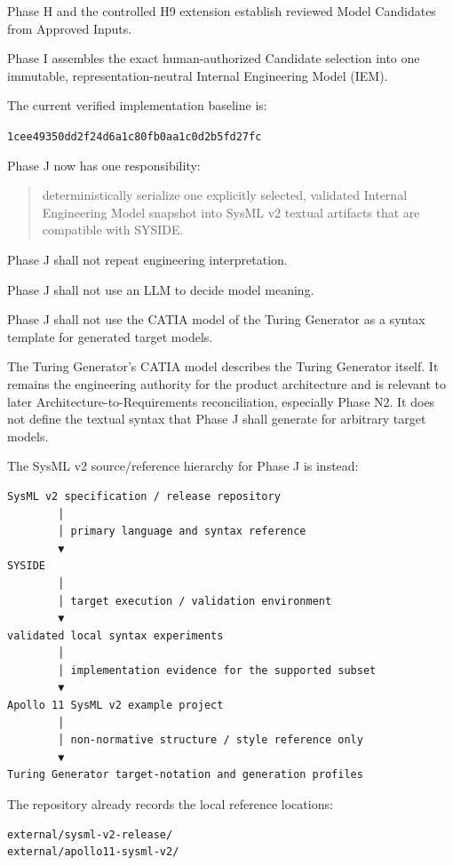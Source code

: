 Phase H and the controlled H9 extension establish reviewed Model Candidates from Approved Inputs.

Phase I assembles the exact human-authorized Candidate selection into one immutable, representation-neutral Internal Engineering Model (IEM).

The current verified implementation baseline is:

\texttt{1cee49350dd2f24d6a1c80fb0aa1c0d2b5fd27fc}

Phase J now has one responsibility:

\begin{quote}
deterministically serialize one explicitly selected, validated Internal Engineering Model snapshot into SysML v2 textual artifacts that are compatible with SYSIDE.
\end{quote}

Phase J shall not repeat engineering interpretation.

Phase J shall not use an LLM to decide model meaning.

Phase J shall not use the CATIA model of the Turing Generator as a syntax template for generated target models.

The Turing Generator's CATIA model describes the Turing Generator itself. It remains the engineering authority for the product architecture and is relevant to later Architecture-to-Requirements reconciliation, especially Phase N2. It does not define the textual syntax that Phase J shall generate for arbitrary target models.

The SysML v2 source/reference hierarchy for Phase J is instead:

\begin{verbatim}
SysML v2 specification / release repository
        │
        │ primary language and syntax reference
        ▼
SYSIDE
        │
        │ target execution / validation environment
        ▼
validated local syntax experiments
        │
        │ implementation evidence for the supported subset
        ▼
Apollo 11 SysML v2 example project
        │
        │ non-normative structure / style reference only
        ▼
Turing Generator target-notation and generation profiles
\end{verbatim}

The repository already records the local reference locations:

\begin{verbatim}
external/sysml-v2-release/
external/apollo11-sysml-v2/
\end{verbatim}

